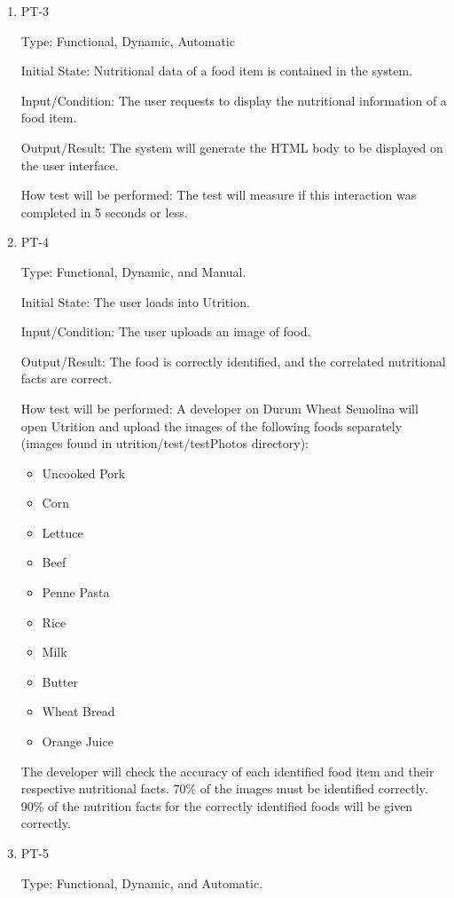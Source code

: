 \documentclass[12pt, titlepage]{article}
\begin{document}
\begin{enumerate}
		\item{PT-3}
		
		Type: Functional, Dynamic, Automatic
		
		Initial State: Nutritional data of a food item is contained in the 
		system.
		
		Input/Condition: The user requests to display the nutritional information of a 
		food item.
		
		Output/Result: The system will generate the HTML body to be displayed on 
		the user 
		interface.
		
		How test will be performed: The test will measure if this interaction 
		was completed in 5 seconds or less.
		
		\item{PT-4} 
		
		Type: Functional, Dynamic, and Manual.
		
		Initial State: The user loads into Utrition.
		
		Input/Condition: The user uploads an image of food.
		
		Output/Result: The food is correctly identified, and the correlated nutritional facts are correct.
		
		How test will be performed: A developer on Durum Wheat Semolina will open Utrition and upload the images of the following foods separately (images found in utrition/test/testPhotos directory):
		\begin{itemize}
			\item Uncooked Pork
			\item Corn
			\item Lettuce
			\item Beef
			\item Penne Pasta
			\item Rice
			\item Milk
			\item Butter
			\item Wheat Bread
			\item Orange Juice
		\end{itemize} 
		
		The developer will check the accuracy of each identified food item and 
		their respective nutritional facts. 70\% of the images must be identified correctly. 90\% of the nutrition facts for the correctly identified foods will be given correctly.
		
		\item{PT-5}
		
		Type: Functional, Dynamic, and Automatic.
		

\end{enumerate}
\end{document}
